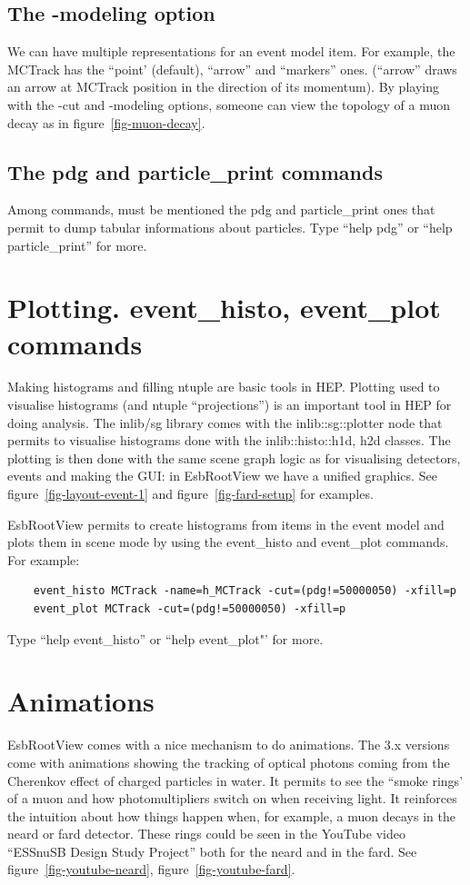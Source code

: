 \documentclass{webofc}
\begin{document}
\subsection{The -modeling option}
\label{cut}  
  We can have multiple representations for an event model item. For
  example, the MCTrack has the ``point' (default), ``arrow'' and
  ``markers'' ones. (``arrow'' draws an arrow at MCTrack position in
  the direction of its momentum).
  By playing with the -cut and  -modeling options, someone can view the topology of a muon decay as
  in figure~\ref{fig-muon-decay}.

\subsection{The pdg and particle\_print commands}
 Among commands, must be mentioned the pdg and particle\_print ones
 that permit to dump tabular informations about particles. Type ``help pdg'' or ``help
 particle\_print'' for more.

\section{Plotting. event\_histo, event\_plot commands}
  Making histograms and filling ntuple are basic tools in HEP. Plotting
  used to visualise histograms (and ntuple ``projections'') is an
  important tool in HEP for doing analysis. The inlib/sg library comes with
  the inlib::sg::plotter node that permits to visualise
  histograms done with the inlib::histo::h1d, h2d
  classes. The plotting is then done with
  the same scene graph logic as for visualising detectors, events
  and making the GUI: in EsbRootView we have a unified graphics.
  See figure~\ref{fig-layout-event-1} and figure~\ref{fig-fard-setup} for
  examples.

   EsbRootView permits to create histograms from items in the event
  model and plots them in scene mode by using the event\_histo and
  event\_plot commands. For example:
\begin{verbatim}
    event_histo MCTrack -name=h_MCTrack -cut=(pdg!=50000050) -xfill=p
    event_plot MCTrack -cut=(pdg!=50000050) -xfill=p
\end{verbatim}
  Type ``help event\_histo'' or ``help event\_plot"' for more.
  
\section{Animations}
 EsbRootView comes with a nice mechanism to do animations. The 3.x
 versions come with animations showing the tracking of optical photons
 coming from the Cherenkov effect of charged particles in water. It permits to see the ``smoke rings' of
 a muon and how photomultipliers switch on when receiving light. It reinforces the
 intuition about how things happen when, for example, a
 muon decays in the neard or fard detector.
 These rings could be seen in the YouTube video ``ESSnuSB Design Study
 Project'' both for the neard and in the fard. See
 figure~\ref{fig-youtube-neard}, figure~\ref{fig-youtube-fard}. 
 
\end{document}
